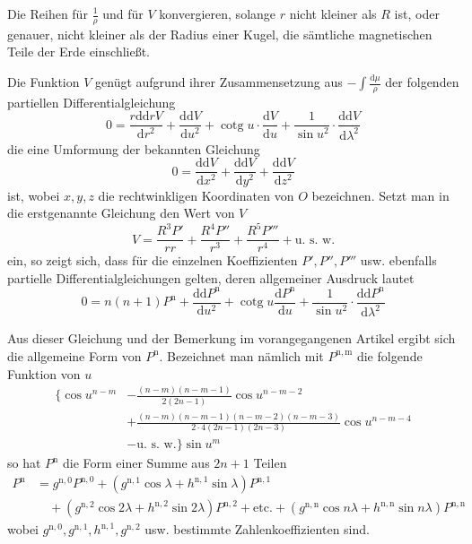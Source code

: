Die Reihen für $\frac1\rho$ und für $V$ konvergieren, solange $r$ nicht kleiner als $R$ ist, oder genauer, nicht kleiner als der Radius einer Kugel, die sämtliche magnetischen Teile der Erde einschließt.

Die Funktion $V$ genügt aufgrund ihrer Zusammensetzung aus $-\int\frac{\mathrm{d}\mu}{\rho}$ der folgenden partiellen Differentialgleichung
\[
0=\frac{r\mathrm{d}\mathrm{d}rV}{\mathrm{d}r^2}+\frac{\mathrm{d}\mathrm{d}V}{\mathrm{d}u^2}+\operatorname{cotg}u\cdot\frac{\mathrm{d}V}{\mathrm{d}u}+\frac1{\sin u^2}\cdot\frac{\mathrm{d}\mathrm{d}V}{\mathrm{d}\lambda^2}
\]
die eine Umformung der bekannten Gleichung
\[
0=\frac{\mathrm{d}\mathrm{d}V}{\mathrm{d}x^2}+\frac{\mathrm{d}\mathrm{d}V}{\mathrm{d}y^2}+\frac{\mathrm{d}\mathrm{d}V}{\mathrm{d}z^2}
\]
ist, wobei $x,y,z$ die rechtwinkligen Koordinaten von $O$ bezeichnen. Setzt man in die erstgenannte Gleichung den Wert von $V$
\[
V=\frac{R^3P'}{rr}+\frac{R^4P''}{r^3}+\frac{R^5P'''}{r^4}+\text{u. s. w.}
\]
ein, so zeigt sich, dass für die einzelnen Koeffizienten $P',P'',P'''$ usw. ebenfalls partielle Differentialgleichungen gelten, deren allgemeiner Ausdruck lautet
\[
0=n(n+1)P^{\mathrm{n}}+\frac{\mathrm{d}\mathrm{d}P^{\mathrm{n}}}{\mathrm{d}u^2}+\operatorname{cotg}u\frac{\mathrm{d}P^{\mathrm{n}}}{\mathrm{d}u}+\frac1{\sin u^2}\cdot\frac{\mathrm{d}\mathrm{d}P^{\mathrm{n}}}{\mathrm{d}\lambda^2}
\]

Aus dieser Gleichung und der Bemerkung im vorangegangenen Artikel ergibt sich die allgemeine Form von $P^{\mathrm{n}}$. Bezeichnet man nämlich mit $P^{\mathrm{n,m}}$ die folgende Funktion von $u$
\[
\begin{aligned}
\{\cos u^{n-m}&-\frac{(n-m)(n-m-1)}{2(2n-1)}\cos u^{n-m-2}\\
&+\frac{(n-m)(n-m-1)(n-m-2)(n-m-3)}{2\cdot4(2n-1)(2n-3)}\cos u^{n-m-4}\\&-\text{u. s. w.}\}\sin u^m
\end{aligned}
\]
so hat $P^{\mathrm{n}}$ die Form einer Summe aus $2n+1$ Teilen
\[
\begin{aligned}
P^{\mathrm{n}}&=g^{\mathrm{n,0}}P^{\mathrm{n,0}}+(g^{\mathrm{n,1}}\cos\lambda+h^{\mathrm{n,1}}\sin\lambda)P^{\mathrm{n,1}}\\
&\quad+(g^{\mathrm{n,2}}\cos2\lambda+h^{\mathrm{n,2}}\sin2\lambda)P^{\mathrm{n,2}}+\text{etc.}+(g^{\mathrm{n,n}}\cos n\lambda+h^{\mathrm{n,n}}\sin n\lambda)P^{\mathrm{n,n}}
\end{aligned}
\]
wobei $g^{\mathrm{n,0}},g^{\mathrm{n,1}},h^{\mathrm{n,1}},g^{\mathrm{n,2}}$ usw. bestimmte Zahlenkoeffizienten sind.

